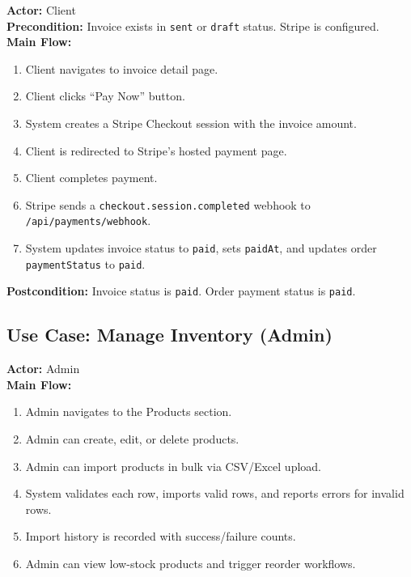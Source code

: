 \documentclass[12pt,a4paper]{report}
\begin{document}
\begin{tcolorbox}[reqbox,title={UC-02: Pay Invoice via Stripe}]
\textbf{Actor:} Client \\
\textbf{Precondition:} Invoice exists in \texttt{sent} or \texttt{draft} status. Stripe is configured. \\
\textbf{Main Flow:}
\begin{enumerate}[leftmargin=1.5em]
  \item Client navigates to invoice detail page.
  \item Client clicks ``Pay Now'' button.
  \item System creates a Stripe Checkout session with the invoice amount.
  \item Client is redirected to Stripe's hosted payment page.
  \item Client completes payment.
  \item Stripe sends a \texttt{checkout.session.completed} webhook to \texttt{/api/payments/webhook}.
  \item System updates invoice status to \texttt{paid}, sets \texttt{paidAt}, and updates order \texttt{paymentStatus} to \texttt{paid}.
\end{enumerate}
\textbf{Postcondition:} Invoice status is \texttt{paid}. Order payment status is \texttt{paid}.
\end{tcolorbox}

\subsection{Use Case: Manage Inventory (Admin)}

\begin{tcolorbox}[reqbox,title={UC-03: Admin Inventory Management}]
\textbf{Actor:} Admin \\
\textbf{Main Flow:}
\begin{enumerate}[leftmargin=1.5em]
  \item Admin navigates to the Products section.
  \item Admin can create, edit, or delete products.
  \item Admin can import products in bulk via CSV/Excel upload.
  \item System validates each row, imports valid rows, and reports errors for invalid rows.
  \item Import history is recorded with success/failure counts.
  \item Admin can view low-stock products and trigger reorder workflows.
\end{enumerate}
\end{tcolorbox}
\end{document}
